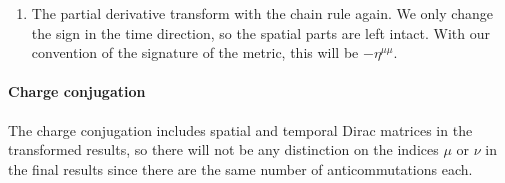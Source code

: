 \documentclass[11pt, english, fleqn, DIV=15, headinclude, BCOR=1cm]{scrartcl}
\begin{document}
\begin{enumerate}
\begin{align*}
{\[                    \begin{pmatrix}
                        & 1+2+0=3 & 2+2+1=5 & 2+1+0=3 \\
                        & & 1+2+1=4 & 1+1+0=2 \\
                        & & & 2+1+1=4
                    \end{pmatrix}.
                \]
                This can be summed up in
            }
            &= - \eta^{\mu\mu} \eta^{\nu\nu} \bar\psi \mat\gamma^1
            \mat\gamma^3 \mat\gamma^3 \mat\gamma^1 \gamma^{\mu\nu} \psi.
            \intertext{%
                Now we can remove the pairs of Dirac matrices. Each pair will
                give a minus sign, so the total sign does not change.
            }
            &= - \eta^{\mu\mu} \eta^{\nu\nu} \bar\psi \psi
        \end{align*}

    \item
        The partial derivative transform with the chain rule again. We only
        change the sign in the time direction, so the spatial parts are left
        intact. With our convention of the signature of the metric, this will
        be $- \eta^{\mu\mu}$.
\end{enumerate}

\paragraph{Charge conjugation}

The charge conjugation includes spatial and temporal Dirac matrices in the
transformed results, so there will not be any distinction on the indices $\mu$
or $\nu$ in the final results since there are the same number of
anticommutations each.
\end{document}
